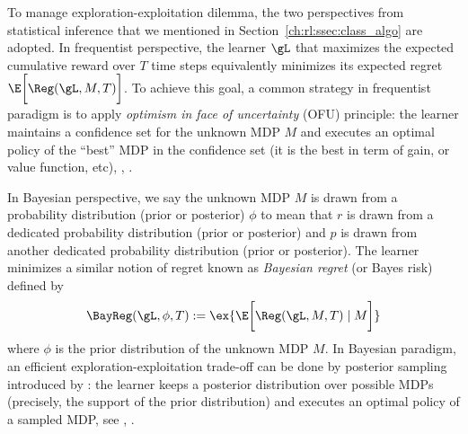 To manage exploration-exploitation dilemma, the two perspectives from statistical inference that we mentioned in Section~\ref{ch:rl:ssec:class_algo} are adopted. %
In frequentist perspective, the learner $\gL$ that maximizes the expected cumulative reward over $T$ time steps equivalently minimizes its expected regret $\E\bigg[\Reg(\gL, M, T)\bigg]$.
To achieve this goal, a common strategy in frequentist paradigm is to apply \emph{optimism in face of uncertainty} (OFU) principle: the learner maintains a confidence set for the unknown MDP $M$ and executes an optimal policy of the
“best” MDP in the confidence set (it is the best in term of gain, or value function, etc), \eg, \cite{jaksch2010near, filippi2010optimism, bartlett2012regal, azar2017minimax, fruit2017regret, jin2018q, fruit2018efficient, fruit2018near, zanette2019tighter, zhang2019regret, bourel2020tightening, ortner2020regret}.

In Bayesian perspective, we say the unknown MDP $M$ is drawn from a probability distribution (prior or posterior) $\phi$ to mean that $r$ is drawn from a dedicated probability distribution (prior or posterior) and $p$ is drawn from another dedicated probability distribution (prior or posterior).
The learner minimizes a similar notion of regret known as \emph{Bayesian regret} (or Bayes risk) defined by
\begin{equation}
    \label{eq:bayes_rg}
    \BayReg(\gL, \phi, T):=\ex{\E\bigg[\Reg(\gL, M, T) \mid M\bigg]}
\end{equation}
where $\phi$ is the prior distribution of the unknown MDP $M$.
In Bayesian paradigm, an efficient exploration-exploitation trade-off can be done by posterior sampling introduced by \cite{thompson1933likelihood}: the learner keeps a posterior distribution over possible MDPs (precisely, the support of the prior distribution) and executes an optimal policy of a sampled MDP, see \eg, \cite{osband2013more, gopalan2015thompson, ouyang2017learning}.

